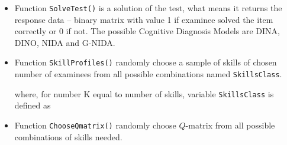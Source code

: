 \documentclass[english]{pwr_wmat_praca_dyplomowa}
\theoremstyle{plain}
\numberwithin{theorem}{chapter}
\theoremstyle{definition}
\numberwithin{theorem}{chapter}
\begin{document}
	
	\begin{itemize}
		
		\item  Function \texttt{SolveTest()} is a solution of the test, what means it returns the response data -- binary matrix with value 1 if examinee solved the item correctly or 0 if not. The possible Cognitive Diagnosis Models are DINA, DINO, NIDA and G-NIDA.
		
		
		
		\item Function \texttt{SkillProfiles()} randomly choose a sample of skills of chosen number of examinees from all possible combinations named \texttt{SkillsClass}.
		
		
		
		\noindent where, for number K equal to number of skills, variable \texttt{SkillsClass} is defined as
		
		
		
		\item Function \texttt{ChooseQmatrix()} randomly choose $Q$-matrix from all possible combinations of skills needed. 
		
		
		
	\end{itemize}
	
	
	
	
	\newpage
	
\end{document}
